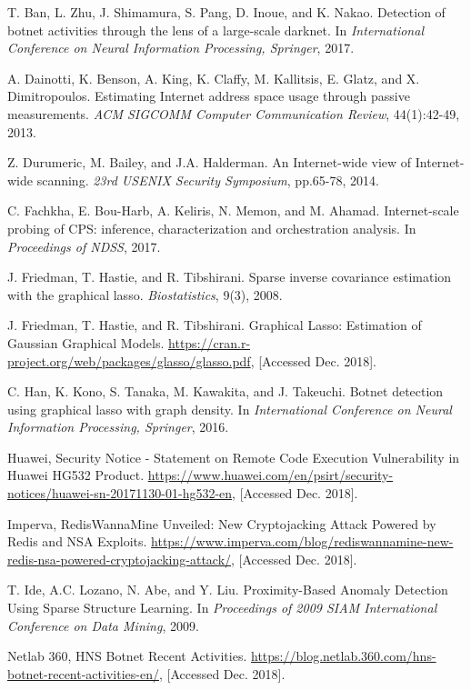 \documentclass[conference]{IEEEtran}
\begin{document}
\begin{thebibliography}{99}
T. Ban, L. Zhu, J. Shimamura, S. Pang, D. Inoue, and K. Nakao. Detection of botnet activities through the lens of a large-scale darknet. In \textit{International Conference on Neural Information Processing, Springer}, 2017.

A. Dainotti, K. Benson, A. King, K. Claffy, M. Kallitsis, E. Glatz, and X. Dimitropoulos. Estimating Internet address space usage through passive measurements. \textit{ACM SIGCOMM Computer Communication Review}, 44(1):42-49, 2013.

Z. Durumeric, M. Bailey, and J.A. Halderman. An Internet-wide view of Internet-wide scanning. \textit{23rd USENIX Security Symposium}, pp.65-78, 2014.

C. Fachkha, E. Bou-Harb, A. Keliris, N. Memon, and M. Ahamad. Internet-scale probing of CPS: inference, characterization and orchestration analysis. In \textit{Proceedings of NDSS}, 2017.

J. Friedman, T. Hastie, and R. Tibshirani. Sparse inverse covariance estimation with the graphical lasso. \textit{Biostatistics}, 9(3), 2008.

J. Friedman, T. Hastie, and R. Tibshirani. Graphical Lasso: Estimation of Gaussian Graphical Models. \url{https://cran.r-project.org/web/packages/glasso/glasso.pdf}, [Accessed Dec. 2018].

C. Han, K. Kono, S. Tanaka, M. Kawakita, and J. Takeuchi. Botnet detection using graphical lasso with graph density. In \textit{International Conference on Neural Information Processing, Springer}, 2016.

Huawei, Security Notice - Statement on Remote Code Execution Vulnerability in Huawei HG532 Product. \url{https://www.huawei.com/en/psirt/security-notices/huawei-sn-20171130-01-hg532-en}, [Accessed Dec. 2018].

Imperva, RedisWannaMine Unveiled: New Cryptojacking Attack Powered by Redis and NSA Exploits. \url{https://www.imperva.com/blog/rediswannamine-new-redis-nsa-powered-cryptojacking-attack/}, [Accessed Dec. 2018].

T. Ide, A.C. Lozano, N. Abe, and Y. Liu. Proximity-Based Anomaly Detection Using Sparse Structure Learning. In \textit{Proceedings of 2009 SIAM International Conference on Data Mining}, 2009.

Netlab 360, HNS Botnet Recent Activities. \url{https://blog.netlab.360.com/hns-botnet-recent-activities-en/}, [Accessed Dec. 2018].


\end{thebibliography}
\end{document}
